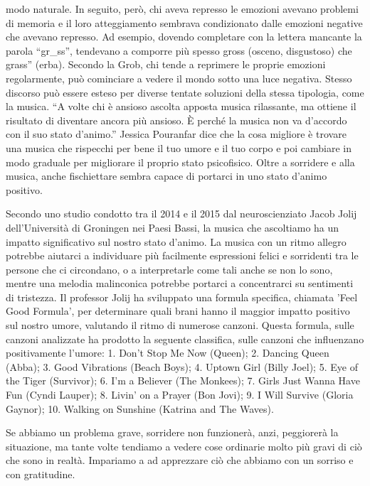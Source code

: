 \documentclass[12pt]{book} %
\begin{document}
modo naturale. In seguito, però, chi aveva represso le emozioni avevano problemi di memoria e il loro atteggiamento
sembrava condizionato dalle emozioni negative che avevano represso. Ad esempio, dovendo completare con la lettera
mancante la parola “gr\_ss”, tendevano a comporre più spesso {\textquotedbl}gross{\textquotedbl} (osceno, disgustoso)
che {\textquotedbl}grass” (erba). Secondo la Grob, chi tende a reprimere le proprie emozioni regolarmente, può
cominciare a vedere il mondo sotto una luce negativa. Stesso discorso può essere esteso per diverse tentate soluzioni
della stessa tipologia, come la musica. “A volte chi è ansioso ascolta apposta musica rilassante, ma ottiene il
risultato di diventare ancora più ansioso. È perché la musica non va d'accordo con il suo stato
d'animo.” Jessica Pouranfar dice che la cosa migliore è trovare una musica che rispecchi per bene
il tuo umore e il tuo corpo e poi cambiare in modo graduale per migliorare il proprio stato
psicofisico. 
Oltre a sorridere e alla musica, anche fischiettare sembra capace di portarci in uno stato d'animo positivo.

Secondo uno studio condotto tra il 2014 e il 2015 dal neuroscienziato Jacob Jolij dell'Università di Groningen nei Paesi Bassi, la musica che ascoltiamo ha un impatto significativo sul nostro stato d'animo. La musica con un ritmo allegro potrebbe aiutarci a individuare più facilmente espressioni felici e sorridenti tra le persone che ci circondano, o a interpretarle come tali anche se non lo sono, mentre una melodia malinconica potrebbe portarci a concentrarci su sentimenti di tristezza. Il professor Jolij ha sviluppato una formula specifica, chiamata 'Feel Good Formula', per determinare quali brani hanno il maggior impatto positivo sul nostro umore, valutando il ritmo di numerose canzoni. Questa formula, sulle canzoni analizzate ha prodotto la seguente classifica, sulle canzoni che influenzano positivamente l'umore: 1. Don't Stop Me Now (Queen); 2. Dancing Queen (Abba); 3. Good Vibrations (Beach Boys); 4. Uptown Girl (Billy Joel); 5. Eye of the Tiger (Survivor); 6. I'm a Believer (The Monkees); 7. Girls Just Wanna Have Fun (Cyndi Lauper); 8. Livin' on a Prayer (Bon Jovi); 9. I Will Survive (Gloria Gaynor); 10. Walking on Sunshine (Katrina and The Waves).

Se abbiamo un problema grave, sorridere non funzionerà, anzi, peggiorerà la situazione, ma tante volte tendiamo a vedere
cose ordinarie molto più gravi di ciò che sono in realtà. Impariamo a ad apprezzare ciò che abbiamo con un sorriso e
con gratitudine.
\end{document}
